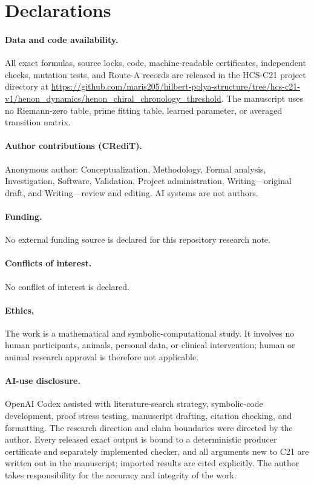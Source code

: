 \section*{Declarations}

\paragraph{Data and code availability.}
All exact formulas, source locks, code, machine-readable certificates,
independent checks, mutation tests, and Route-A records are released in the
HCS-C21 project directory at
\url{https://github.com/maris205/hilbert-polya-structure/tree/hcs-c21-v1/henon_dynamics/henon_chiral_chronology_threshold}.
The manuscript uses no Riemann-zero table, prime fitting table, learned
parameter, or averaged transition matrix.

\paragraph{Author contributions (CRediT).}
Anonymous author: Conceptualization, Methodology, Formal analysis,
Investigation, Software, Validation, Project administration, Writing---original
draft, and Writing---review and editing.  AI systems are not authors.

\paragraph{Funding.}
No external funding source is declared for this repository research note.

\paragraph{Conflicts of interest.}
No conflict of interest is declared.

\paragraph{Ethics.}
The work is a mathematical and symbolic-computational study.  It involves no
human participants, animals, personal data, or clinical intervention; human
or animal research approval is therefore not applicable.

\paragraph{AI-use disclosure.}
OpenAI Codex assisted with literature-search strategy, symbolic-code
development, proof stress testing, manuscript drafting, citation checking,
and formatting.  The research direction and claim boundaries were directed
by the author.  Every released exact output is bound to a deterministic
producer certificate and separately implemented checker, and all arguments
new to C21 are written out in the manuscript; imported results are cited
explicitly.  The author takes responsibility for the accuracy and integrity
of the work.
